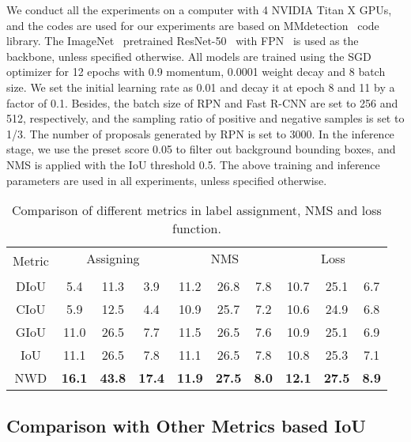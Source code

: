 \documentclass{article}
\newcommand{\fixedvskip}{-3mm}
\begin{document}
We conduct all the experiments on a computer with 4 NVIDIA Titan X GPUs, and the codes are used for our experiments are based on MMdetection~\cite{mmdetection_2019_arXiv} code library. The ImageNet~\cite{ImageNet_2015_IJCV}
pretrained ResNet-50~\cite{ResNet_2016_CVPR} with FPN~\cite{FPN_2017_CVPR} is used as the backbone, unless specified otherwise. All models are trained using the SGD optimizer for 12 epochs with 0.9 momentum, 0.0001 weight decay and 8 batch size. We set the initial learning rate as 0.01 and decay it at epoch 8 and 11 by a factor of 0.1. Besides, the batch size of RPN and Fast R-CNN are set to 256 and 512, respectively, and the sampling ratio of positive and negative samples is set to 1/3. The number of proposals generated by RPN is set to 3000. In the inference stage, we use the preset score 0.05 to filter out background bounding boxes, and NMS is applied with the IoU threshold 0.5. The above training and inference parameters are used in all experiments, unless specified otherwise.



\begin{table*}[t]
	\centering
	\setlength{\belowcaptionskip}{0.2cm}
	\caption{Comparison of different metrics in label assignment, NMS and loss function.}
	\begin{tabular}{|c|ccc|ccc|ccc|}  
	\hline
	\multirow{2}{*}{Metric}  & \multicolumn{3}{c|}{Assigning}  & \multicolumn{3}{c|}{NMS}  & \multicolumn{3}{c|}{Loss}  \\
	 &   &  & &  &  &  &   &  & \\
	\hline
	DIoU  & 5.4 & 11.3 & 3.9  & 11.2 & 26.8 & 7.8 & 10.7 & 25.1 & 6.7 \\
	CIoU & 5.9 & 12.5 & 4.4 & 10.9 & 25.7 & 7.2 & 10.6 & 24.9 & 6.8  \\
	GIoU & 11.0 & 26.5  & 7.7 & 11.5 & 26.5 & 7.6 & 10.9 & 25.1 & 6.9  \\
	IoU & 11.1 & 26.5  & 7.8 & 11.1 & 26.5 & 7.8 & 10.8 & 25.3 & 7.1 \\
	NWD & \textbf{16.1} & \textbf{43.8}  & \textbf{17.4} & \textbf{11.9} & \textbf{27.5}  & \textbf{8.0} & \textbf{12.1} & \textbf{27.5}  & \textbf{8.9} \\
	\hline
	\end{tabular}
	\label{tab:metrics}
	\vspace{\fixedvskip}
\end{table*}

\subsection{Comparison with Other Metrics based IoU}
\end{document}
